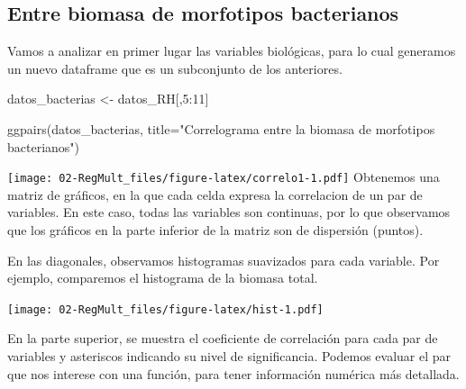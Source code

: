 \documentclass[
]{book}
\newenvironment{Shaded}{\begin{snugshade}}{\end{snugshade}}
\newcommand{\AttributeTok}[1]{\textcolor[rgb]{0.77,0.63,0.00}{#1}}
\newcommand{\DecValTok}[1]{\textcolor[rgb]{0.00,0.00,0.81}{#1}}
\newcommand{\FunctionTok}[1]{\textcolor[rgb]{0.00,0.00,0.00}{#1}}
\newcommand{\NormalTok}[1]{#1}
\newcommand{\OtherTok}[1]{\textcolor[rgb]{0.56,0.35,0.01}{#1}}
\newcommand{\SpecialCharTok}[1]{\textcolor[rgb]{0.00,0.00,0.00}{#1}}
\newcommand{\StringTok}[1]{\textcolor[rgb]{0.31,0.60,0.02}{#1}}
\begin{document}
\hypertarget{entre-biomasa-de-morfotipos-bacterianos}{%
\subsection{Entre biomasa de morfotipos bacterianos}\label{entre-biomasa-de-morfotipos-bacterianos}}

Vamos a analizar en primer lugar las variables biológicas, para lo cual generamos un nuevo dataframe que es un subconjunto de los anteriores.

\begin{Shaded}
\begin{Highlighting}[]
\NormalTok{datos\_bacterias }\OtherTok{\textless{}{-}}\NormalTok{ datos\_RH[,}\DecValTok{5}\SpecialCharTok{:}\DecValTok{11}\NormalTok{]}
  
\FunctionTok{ggpairs}\NormalTok{(datos\_bacterias, }\AttributeTok{title=}\StringTok{"Correlograma entre la biomasa de morfotipos bacterianos"}\NormalTok{) }
\end{Highlighting}
\end{Shaded}

\texttt{[image: 02-RegMult\_files/figure-latex/correlo1-1.pdf]}
Obtenemos una matriz de gráficos, en la que cada celda expresa la correlacion de un par de variables. En este caso, todas las variables son continuas, por lo que observamos que los gráficos en la parte inferior de la matriz son de dispersión (puntos).

En las diagonales, observamos histogramas suavizados para cada variable. Por ejemplo, comparemos el histograma de la biomasa total.

\begin{Shaded}
\end{Shaded}

\texttt{[image: 02-RegMult\_files/figure-latex/hist-1.pdf]}

En la parte superior, se muestra el coeficiente de correlación para cada par de variables y asteriscos indicando su nivel de significancia. Podemos evaluar el par que nos interese con una función, para tener información numérica más detallada.
\end{document}
